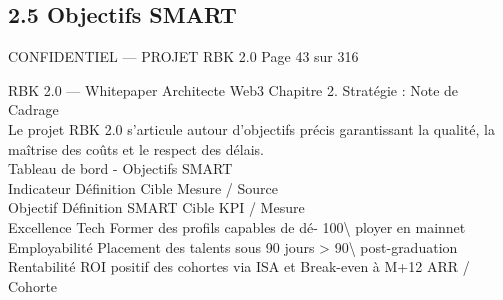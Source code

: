 \subsection{2.5 Objectifs SMART}
\vspace{0.5em}
\vspace{0.5em}
\begin{confidential}CONFIDENTIEL — PROJET RBK 2.0                                          Page 43 sur 316\end{confidential}
RBK 2.0 — Whitepaper Architecte Web3                                                                                          Chapitre 2. Stratégie : Note de Cadrage\\
\vspace{0.5em}
\vspace{0.5em}
\vspace{0.5em}
Le projet RBK 2.0 s’articule autour d’objectifs précis garantissant la qualité, la maîtrise des coûts et le respect des délais.\\
\vspace{0.5em}
Tableau de bord - Objectifs SMART\\
\vspace{0.5em}
\vspace{0.5em}
\vspace{0.5em}
Indicateur                                Définition                                Cible                                    Mesure / Source\\
Objectif                                  Définition SMART                          Cible                                    KPI / Mesure\\
Excellence Tech                           Former des profils capables de dé-        100\textbackslash{}%
ployer en mainnet\\
Employabilité                             Placement des talents sous 90 jours       \textgreater{} 90\textbackslash{}%
post-graduation\\
Rentabilité                               ROI positif des cohortes via ISA et       Break-even à M+12                        ARR / Cohorte\\
\vspace{0.5em}
\vspace{0.5em}
\vspace{0.5em}
